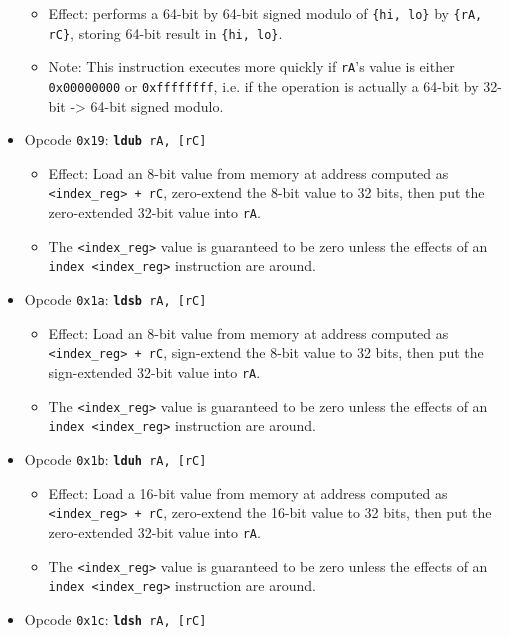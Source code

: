 \documentclass{article}
\begin{document}
\begin{itemize}
\begin{itemize}
			\item Effect:  performs a 64-bit by 64-bit signed modulo of
			\texttt{\{hi, lo\}} by \texttt{\{rA, rC\}}, storing 64-bit
			result in \texttt{\{hi, lo\}}.
			\item Note:  This instruction executes more quickly if
			\texttt{rA}'s value is either \texttt{0x00000000} or
			\texttt{0xffffffff},  i.e. if the operation is actually a
			64-bit by 32-bit -> 64-bit signed modulo.
		\end{itemize}
		\item Opcode \texttt{0x19}:
			\texttt{\textbf{ldub} rA, [rC]}
		\begin{itemize}
			\item Effect:  Load an 8-bit value from memory at address
			computed as \texttt{<index\_reg> + \texttt{rC}}, zero-extend
			the 8-bit value to 32 bits, then put the zero-extended 32-bit
			value into \texttt{rA}.
			\item The \texttt{<index\_reg>} value is guaranteed to be zero
			unless the effects of an \texttt{index <index\_reg>}
			instruction are around.
		\end{itemize}
		\item Opcode \texttt{0x1a}:
			\texttt{\textbf{ldsb} rA, [rC]}
		\begin{itemize}
			\item Effect:  Load an 8-bit value from memory at address
			computed as \texttt{<index\_reg> + \texttt{rC}}, sign-extend
			the 8-bit value to 32 bits, then put the sign-extended 32-bit
			value into \texttt{rA}.
			\item The \texttt{<index\_reg>} value is guaranteed to be zero
			unless the effects of an \texttt{index <index\_reg>}
			instruction are around.
		\end{itemize}
		\item Opcode \texttt{0x1b}:
			\texttt{\textbf{lduh} rA, [rC]}
		\begin{itemize}
			\item Effect:  Load a 16-bit value from memory at address
			computed as \texttt{<index\_reg> + \texttt{rC}}, zero-extend
			the 16-bit value to 32 bits, then put the zero-extended 32-bit
			value into \texttt{rA}.
			\item The \texttt{<index\_reg>} value is guaranteed to be zero
			unless the effects of an \texttt{index <index\_reg>}
			instruction are around.
		\end{itemize}
		\item Opcode \texttt{0x1c}:
			\texttt{\textbf{ldsh} rA, [rC]}

\end{itemize}
\end{document}
